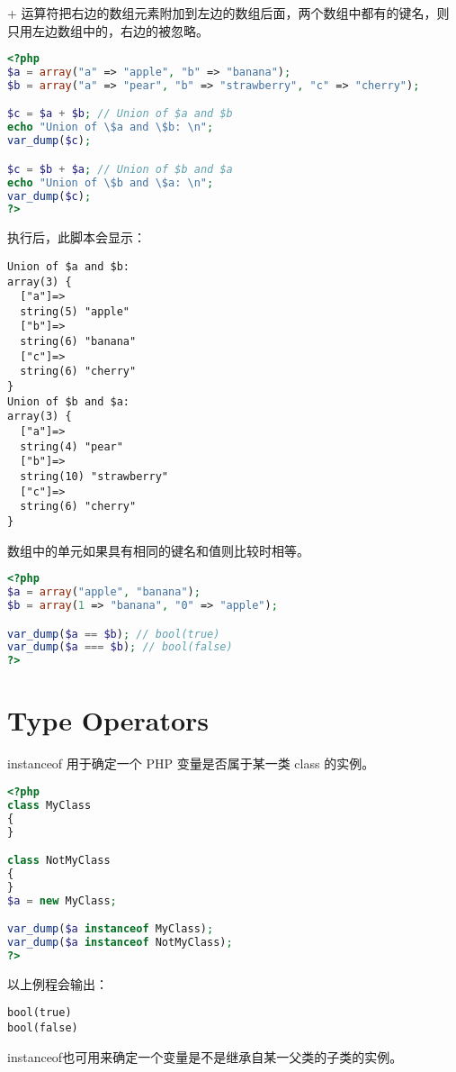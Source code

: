 + 运算符把右边的数组元素附加到左边的数组后面，两个数组中都有的键名，则只用左边数组中的，右边的被忽略。

\begin{lstlisting}[language=PHP]
<?php
$a = array("a" => "apple", "b" => "banana");
$b = array("a" => "pear", "b" => "strawberry", "c" => "cherry");

$c = $a + $b; // Union of $a and $b
echo "Union of \$a and \$b: \n";
var_dump($c);

$c = $b + $a; // Union of $b and $a
echo "Union of \$b and \$a: \n";
var_dump($c);
?>
\end{lstlisting}

执行后，此脚本会显示：

\begin{verbatim}
Union of $a and $b:
array(3) {
  ["a"]=>
  string(5) "apple"
  ["b"]=>
  string(6) "banana"
  ["c"]=>
  string(6) "cherry"
}
Union of $b and $a:
array(3) {
  ["a"]=>
  string(4) "pear"
  ["b"]=>
  string(10) "strawberry"
  ["c"]=>
  string(6) "cherry"
}
\end{verbatim}

数组中的单元如果具有相同的键名和值则比较时相等。

\begin{lstlisting}[language=PHP]
<?php
$a = array("apple", "banana");
$b = array(1 => "banana", "0" => "apple");

var_dump($a == $b); // bool(true)
var_dump($a === $b); // bool(false)
?>
\end{lstlisting}


\section{Type Operators}


instanceof 用于确定一个 PHP 变量是否属于某一类 class 的实例。

\begin{lstlisting}[language=PHP]
<?php
class MyClass
{
}

class NotMyClass
{
}
$a = new MyClass;

var_dump($a instanceof MyClass);
var_dump($a instanceof NotMyClass);
?>
\end{lstlisting}


以上例程会输出：

\begin{verbatim}
bool(true)
bool(false)
\end{verbatim}

instanceof也可用来确定一个变量是不是继承自某一父类的子类的实例。

